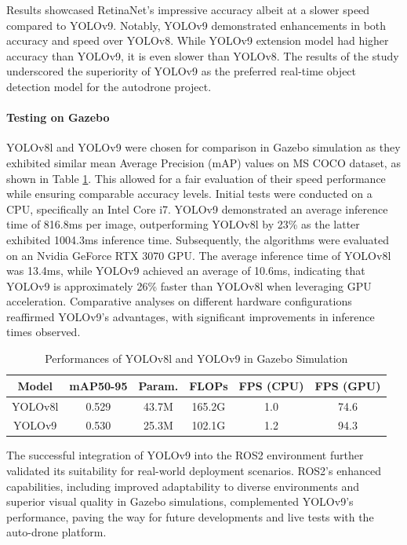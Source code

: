 \documentclass[conference]{IEEEtran}
\begin{document}
Results showcased RetinaNet's impressive accuracy albeit at a slower speed compared to YOLOv9. Notably, YOLOv9 demonstrated enhancements in both accuracy and speed over YOLOv8. While YOLOv9 extension model had higher accuracy than YOLOv9, it is even slower than YOLOv8. The results of the study underscored the superiority of YOLOv9 as the preferred real-time object detection model for the autodrone project. 

\paragraph{Testing on Gazebo}
YOLOv8l and YOLOv9 were chosen for comparison in Gazebo simulation as they exhibited similar mean Average Precision (mAP) values on MS COCO dataset, as shown in Table \ref{Comparison}. This allowed for a fair evaluation of their speed performance while ensuring comparable accuracy levels. Initial tests were conducted on a CPU, specifically an Intel Core i7. YOLOv9 demonstrated an average inference time of 816.8ms per image, outperforming YOLOv8l by 23\% as the latter exhibited 1004.3ms inference time. Subsequently, the algorithms were evaluated on an Nvidia GeForce RTX 3070 GPU. The average inference time of YOLOv8l was 13.4ms, while YOLOv9 achieved an average of 10.6ms, indicating that YOLOv9 is approximately 26\% faster than YOLOv8l when leveraging GPU acceleration. Comparative analyses on different hardware configurations reaffirmed YOLOv9's advantages, with significant improvements in inference times observed.

\begin{table}[h]
\begin{center}
\begin{tabular}{ |c|c|c|c|c|c| } 
 \hline
 Model  & mAP50-95 & Param. & FLOPs & FPS (CPU) & FPS (GPU) \\ 
 \hline
 YOLOv8l & 0.529 & 43.7M & 165.2G & 1.0 & 74.6 \\ 
 \hline
 YOLOv9  & 0.530 & 25.3M & 102.1G & 1.2 & 94.3\\ 
 \hline
\end{tabular}
\end{center}
\caption{Performances of YOLOv8l and YOLOv9 in Gazebo Simulation}
\label{Comparison}
\end{table}

The successful integration of YOLOv9 into the ROS2 environment further validated its suitability for real-world deployment scenarios. ROS2's enhanced capabilities, including improved adaptability to diverse environments and superior visual quality in Gazebo simulations, complemented YOLOv9's performance, paving the way for future developments and live tests with the auto-drone platform.
\end{document}
